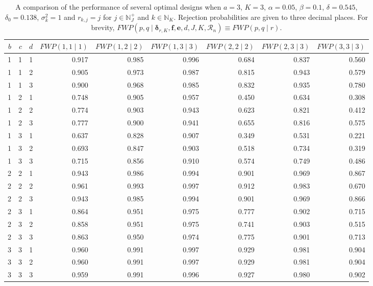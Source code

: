 \documentclass{article}
\numberwithin{equation}{section}
\theoremstyle{plain}
\begin{document}
\def\arraystretch{1.2}
\begin{sidewaystable}[htbp]
	\begin{center}
		\caption{A comparison of the performance of several optimal designs when $a=3$, $K=3$, $\alpha=0.05$, $\beta=0.1$, $\delta=0.545$, $\delta_0=0.138$, $\sigma_k^2=1$ and $r_{k,j}=j$ for $j\in\mathbb{N}_J^+$ and $k\in\mathbb{N}_K$. Rejection probabilities are given to three decimal places. For brevity, $FWP(p,q\mid \boldsymbol{\delta}_{r,K},\boldsymbol{f},\boldsymbol{e},d,J,K,\mathscr{R}_n)\equiv FWP(p,q\mid r)$.}
		\label{taba6}
		\begin{tabular}{rrrrrrrrr}
			\hline
			$b$ & $c$ & $d$ & $FWP(1,1\mid 1)$ & $FWP(1,2\mid 2)$ & $FWP(1,3\mid 3)$ & $FWP(2,2\mid 2)$ & $FWP(2,3\mid 3)$ & $FWP(3,3\mid 3)$ \\
			\hline
			1 & 1 & 1 & 0.917 & 0.985 & 0.996 & 0.684 & 0.837 & 0.560 \\
			1 & 1 & 2 & 0.905 & 0.973 & 0.987 & 0.815 & 0.943 & 0.579 \\
			1 & 1 & 3 & 0.900 & 0.968 & 0.985 & 0.832 & 0.935 & 0.780 \\
			1 & 2 & 1 & 0.748 & 0.905 & 0.957 & 0.450 & 0.634 & 0.308 \\
			1 & 2 & 2 & 0.774 & 0.903 & 0.943 & 0.623 & 0.821 & 0.412 \\
			1 & 2 & 3 & 0.777 & 0.900 & 0.941 & 0.655 & 0.816 & 0.575 \\
			1 & 3 & 1 & 0.637 & 0.828 & 0.907 & 0.349 & 0.531 & 0.221 \\
			1 & 3 & 2 & 0.693 & 0.847 & 0.903 & 0.518 & 0.734 & 0.319 \\
			1 & 3 & 3 & 0.715 & 0.856 & 0.910 & 0.574 & 0.749 & 0.486 \\
			2 & 2 & 1 & 0.943 & 0.986 & 0.994 & 0.901 & 0.969 & 0.867 \\
			2 & 2 & 2 & 0.961 & 0.993 & 0.997 & 0.912 & 0.983 & 0.670 \\
			2 & 2 & 3 & 0.943 & 0.985 & 0.994 & 0.901 & 0.969 & 0.866 \\
			2 & 3 & 1 & 0.864 & 0.951 & 0.975 & 0.777 & 0.902 & 0.715 \\
			2 & 3 & 2 & 0.858 & 0.951 & 0.975 & 0.741 & 0.903 & 0.515 \\
			2 & 3 & 3 & 0.863 & 0.950 & 0.974 & 0.775 & 0.901 & 0.713 \\
			3 & 3 & 1 & 0.960 & 0.991 & 0.997 & 0.929 & 0.981 & 0.904 \\
			3 & 3 & 2 & 0.960 & 0.991 & 0.997 & 0.929 & 0.981 & 0.904 \\
			3 & 3 & 3 & 0.959 & 0.991 & 0.996 & 0.927 & 0.980 & 0.902 \\
			\hline
		\end{tabular}
	\end{center}
\end{sidewaystable}
\end{document}
